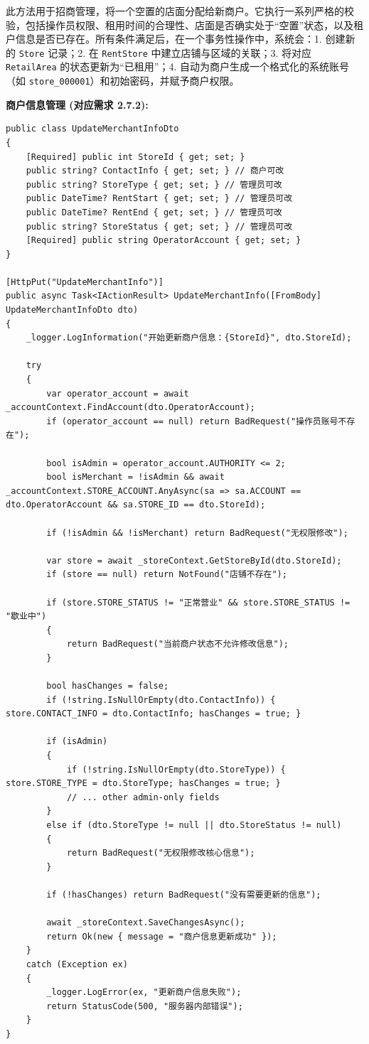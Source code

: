 \documentclass[]{article}
\begin{document}
此方法用于招商管理，将一个空置的店面分配给新商户。它执行一系列严格的校验，包括操作员权限、租用时间的合理性、店面是否确实处于“空置”状态，以及租户信息是否已存在。所有条件满足后，在一个事务性操作中，系统会：1. 创建新的 \texttt{Store} 记录；2. 在 \texttt{RentStore} 中建立店铺与区域的关联；3. 将对应 \texttt{RetailArea} 的状态更新为“已租用”；4. 自动为商户生成一个格式化的系统账号（如 \texttt{store\_000001}）和初始密码，并赋予商户权限。

\textbf{商户信息管理 (对应需求 2.7.2):}
\begin{verbatim}
public class UpdateMerchantInfoDto
{
    [Required] public int StoreId { get; set; }
    public string? ContactInfo { get; set; } // 商户可改
    public string? StoreType { get; set; } // 管理员可改
    public DateTime? RentStart { get; set; } // 管理员可改
    public DateTime? RentEnd { get; set; } // 管理员可改
    public string? StoreStatus { get; set; } // 管理员可改
    [Required] public string OperatorAccount { get; set; }
}

[HttpPut("UpdateMerchantInfo")]
public async Task<IActionResult> UpdateMerchantInfo([FromBody] UpdateMerchantInfoDto dto)
{
    _logger.LogInformation("开始更新商户信息：{StoreId}", dto.StoreId);

    try
    {
        var operator_account = await _accountContext.FindAccount(dto.OperatorAccount);
        if (operator_account == null) return BadRequest("操作员账号不存在");

        bool isAdmin = operator_account.AUTHORITY <= 2;
        bool isMerchant = !isAdmin && await _accountContext.STORE_ACCOUNT.AnyAsync(sa => sa.ACCOUNT == dto.OperatorAccount && sa.STORE_ID == dto.StoreId);

        if (!isAdmin && !isMerchant) return BadRequest("无权限修改");

        var store = await _storeContext.GetStoreById(dto.StoreId);
        if (store == null) return NotFound("店铺不存在");

        if (store.STORE_STATUS != "正常营业" && store.STORE_STATUS != "歇业中")
        {
            return BadRequest("当前商户状态不允许修改信息");
        }

        bool hasChanges = false;
        if (!string.IsNullOrEmpty(dto.ContactInfo)) { store.CONTACT_INFO = dto.ContactInfo; hasChanges = true; }

        if (isAdmin)
        {
            if (!string.IsNullOrEmpty(dto.StoreType)) { store.STORE_TYPE = dto.StoreType; hasChanges = true; }
            // ... other admin-only fields
        }
        else if (dto.StoreType != null || dto.StoreStatus != null)
        {
            return BadRequest("无权限修改核心信息");
        }

        if (!hasChanges) return BadRequest("没有需要更新的信息");

        await _storeContext.SaveChangesAsync();
        return Ok(new { message = "商户信息更新成功" });
    }
    catch (Exception ex)
    {
        _logger.LogError(ex, "更新商户信息失败");
        return StatusCode(500, "服务器内部错误");
    }
}
\end{verbatim}
\end{document}
